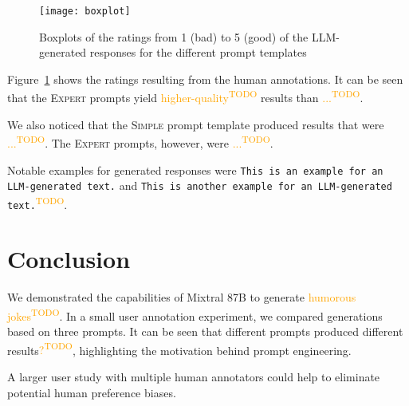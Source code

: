 \documentclass[11pt]{article}
\newcommand{\todo}[1]{\textcolor{orange}{#1\textsuperscript{\footnotesize TODO}}}
\begin{document}
\begin{figure}\centering
  \texttt{[image: boxplot]}
  \caption{Boxplots of the ratings from 1 (bad) to 5 (good) of the LLM-generated responses for the different prompt templates}
  \label{fig:boxplots}
\end{figure}


Figure~\ref{fig:boxplots} shows the ratings resulting from the human annotations.
It can be seen that the \textsc{Expert} prompts yield \todo{higher-quality} results than \todo{...}.

We also noticed that the \textsc{Simple} prompt template produced results that were \todo{...}. The \textsc{Expert} prompts, however, were \todo{...}.

Notable examples for generated responses were \texttt{This is an example for an LLM-generated text.} and  \texttt{This is another example for an LLM-generated text.}\todo{}.

\section{Conclusion}

We demonstrated the capabilities of Mixtral 8\texttimes 7B to generate \todo{humorous jokes}. In a small user annotation experiment, we compared generations based on three prompts.
It can be seen that different prompts produced different results\todo{?}, highlighting the motivation behind prompt engineering.

A larger user study with multiple human annotators could help to eliminate potential human preference biases.


\end{document}
